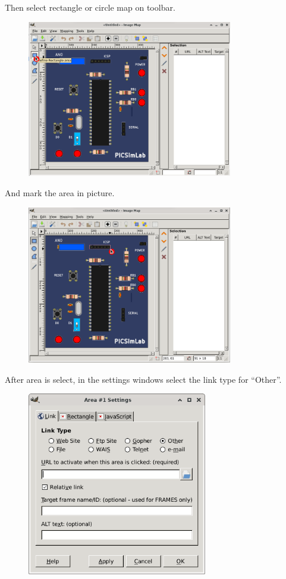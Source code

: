 \pagebreak
Then select rectangle or circle map on toolbar.
\begin{figure}[H]
\center
\includegraphics[width=0.8\textwidth]{img/hb/gimp02.png} 
\end{figure} 

And mark the area in picture.
\begin{figure}[H]
\center
\includegraphics[width=0.8\textwidth]{img/hb/gimp03.png} 
\end{figure} 

\pagebreak
After area is select, in the settings windows select the link type for ``Other''. 
\begin{figure}[H]
\center
\includegraphics[width=0.7\textwidth]{img/hb/gimp04.png} 
\end{figure} 

